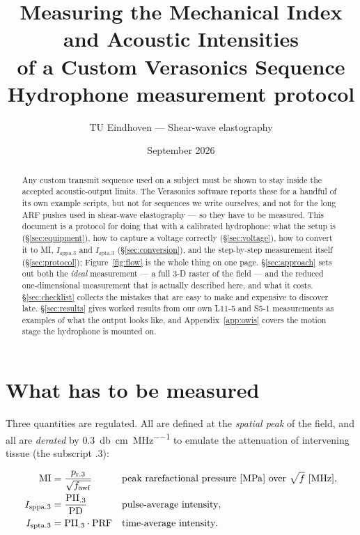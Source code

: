 \documentclass[11pt,a4paper]{article}
\title{\vspace{-1.5em}\textbf{Measuring the Mechanical Index and Acoustic Intensities\\
of a Custom Verasonics Sequence}\\[0.4em]
\large Hydrophone measurement protocol}
\author{TU Eindhoven --- Shear-wave elastography}
\date{September 2026}
\begin{document}
\maketitle

\begin{abstract}
\noindent
Any custom transmit sequence used on a subject must be shown to stay inside the accepted
acoustic-output limits. The Verasonics software reports these for a handful of its own example
scripts, but not for sequences we write ourselves, and not for the long ARF pushes used in
shear-wave elastography --- so they have to be measured. This document is a protocol for doing that
with a calibrated hydrophone: what the setup is (\S\ref{sec:equipment}), how to capture a voltage
correctly (\S\ref{sec:voltage}), how to convert it to MI, $I_\mathrm{sppa.3}$ and
$I_\mathrm{spta.3}$ (\S\ref{sec:conversion}), and the step-by-step measurement itself
(\S\ref{sec:protocol}); Figure~\ref{fig:flow} is the whole thing on one page.
\S\ref{sec:approach} sets out both the \emph{ideal} measurement --- a full
3-D raster of the field --- and the reduced one-dimensional measurement that is actually described
here, and what it costs. \S\ref{sec:checklist} collects the mistakes that are easy to make and
expensive to discover late. \S\ref{sec:results} gives worked results from our own L11-5 and S5-1
measurements as examples of what the output looks like, and Appendix~\ref{app:owis} covers the
motion stage the hydrophone is mounted on.
\end{abstract}

\tableofcontents



\section{What has to be measured}\label{sec:intro}
Three quantities are regulated. All are defined at the \emph{spatial peak} of the field, and all are
\emph{derated} by \SI{0.3}{\decibel\per\centi\metre\per\mega\hertz} to emulate the attenuation of
intervening tissue (the subscript $.3$):

\begin{align}
  \mathrm{MI}          &= \frac{p_\mathrm{r.3}}{\sqrt{f_\mathrm{awf}}}
    & &\text{peak rarefactional pressure [\si{\mega\pascal}] over $\sqrt{f}$ [\si{\mega\hertz}]},
    \label{eq:mi}\\
  I_\mathrm{sppa.3}    &= \frac{\mathrm{PII}_{.3}}{\mathrm{PD}}
    & &\text{pulse-average intensity}, \label{eq:isppa}\\
  I_\mathrm{spta.3}    &= \mathrm{PII}_{.3}\cdot \mathrm{PRF}
    & &\text{time-average intensity}. \label{eq:ispta}
\end{align}
\end{document}
